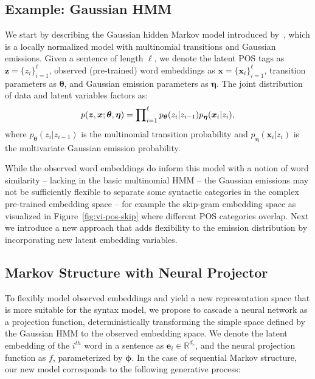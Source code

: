 \documentclass[11pt,a4paper]{article}
\begin{document}
\subsection{Example: Gaussian HMM}

We start by describing the Gaussian hidden Markov model introduced by~\citet{lin2015unsupervised}, which is a locally normalized model with multinomial transitions and Gaussian emissions. Given a sentence of length $\ell$, we denote the latent POS tags as $\bm{z} = \{z_i\}_{i=1}^\ell$, observed (pre-trained) word embeddings as $\bm{x} = \{\bm{x}_i\}_{i=1}^\ell$, transition parameters as $\bm{\theta}$, and Gaussian emission parameters as $\bm{\eta}$. The joint distribution of data and latent variables factors as:
\vspace{-3mm}
\begin{equation}
\hspace{-0.26mm}
p(\bm{z}, \bm{x}; \bm{\theta}, \bm{\eta}) = \prod\nolimits_{i=1}^\ell p_{\bm{\theta}}(z_i | z_{i-1}) p_{\bm{\eta}}(\bm{x}_i | z_i),
\end{equation}
where $p_{\bm{\theta}}(z_i | z_{i-1})$ is the multinomial transition probability and $p_{\bm{\eta}}(\bm{x}_i | z_i)$ is the multivariate Gaussian emission probability. 






While the observed word embeddings do inform this model with a notion of word similarity -- lacking in the basic multinomial HMM -- the Gaussian emissions may not be sufficiently flexible to separate some syntactic categories in the complex pre-trained embedding space -- for example the skip-gram embedding space as visualized in Figure~\ref{fig:vi-pos-skip} where different POS categories overlap. 
Next we introduce a new approach that adds flexibility to the emission distribution by incorporating new latent embedding variables.


\subsection{Markov Structure with Neural Projector}
\label{sec:hmm-neural}
To flexibly model observed embeddings and yield a new representation space that is more suitable for the syntax model, we propose to cascade a neural network as a projection function, deterministically transforming the simple space defined by the Gaussian HMM to the observed embedding space. We denote the latent embedding of the $i^{th}$ word in a sentence as $\bm{e}_i\in \mathbb{R}^{d_e}$, and the neural projection function as $f$, parameterized by $\bm{\phi}$. In the case of sequential Markov structure, our new model corresponds to the following generative process:
\end{document}
